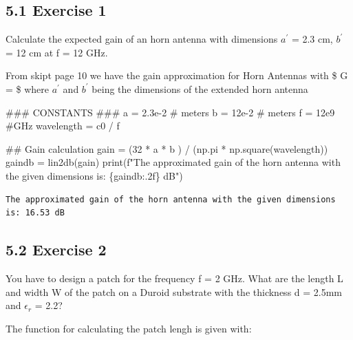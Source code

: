 \documentclass[
  letterpaper,
  DIV=11,
  numbers=noendperiod]{scrartcl}
\newenvironment{Shaded}{\begin{snugshade}}{\end{snugshade}}
\newcommand{\AlertTok}[1]{\textcolor[rgb]{0.68,0.00,0.00}{#1}}
\newcommand{\BuiltInTok}[1]{\textcolor[rgb]{0.00,0.23,0.31}{#1}}
\newcommand{\CommentTok}[1]{\textcolor[rgb]{0.37,0.37,0.37}{#1}}
\newcommand{\DecValTok}[1]{\textcolor[rgb]{0.68,0.00,0.00}{#1}}
\newcommand{\FloatTok}[1]{\textcolor[rgb]{0.68,0.00,0.00}{#1}}
\newcommand{\NormalTok}[1]{\textcolor[rgb]{0.00,0.23,0.31}{#1}}
\newcommand{\OperatorTok}[1]{\textcolor[rgb]{0.37,0.37,0.37}{#1}}
\newcommand{\SpecialCharTok}[1]{\textcolor[rgb]{0.37,0.37,0.37}{#1}}
\newcommand{\SpecialStringTok}[1]{\textcolor[rgb]{0.13,0.47,0.30}{#1}}
\begin{document}
\subsection{5.1 Exercise 1}\label{exercise-1}

Calculate the expected gain of an horn antenna with dimensions \(a^{'}\)
= 2.3 cm, \(b^{'}\) = 12 cm at f = 12 GHz.

From skipt page 10 we have the gain approximation for Horn Antennas with
\$ G = \$ where \(a^{'}\) and
\(b^{'}\) being the dimensions of the extended horn antenna

\begin{Shaded}
\begin{Highlighting}[]
\CommentTok{\#\#\# CONSTANTS }\AlertTok{\#\#\#}
\NormalTok{a }\OperatorTok{=} \FloatTok{2.3e{-}2} \CommentTok{\# meters}
\NormalTok{b }\OperatorTok{=} \FloatTok{12e{-}2} \CommentTok{\# meters}
\NormalTok{f }\OperatorTok{=} \FloatTok{12e9} \CommentTok{\#GHz}
\NormalTok{wavelength }\OperatorTok{=}\NormalTok{ c0 }\OperatorTok{/}\NormalTok{ f}

\CommentTok{\#\# Gain calculation}
\NormalTok{gain }\OperatorTok{=}\NormalTok{ (}\DecValTok{32} \OperatorTok{*}\NormalTok{ a }\OperatorTok{*}\NormalTok{ b ) }\OperatorTok{/}\NormalTok{ (np.pi }\OperatorTok{*}\NormalTok{ np.square(wavelength))}
\NormalTok{gaindb }\OperatorTok{=}\NormalTok{ lin2db(gain)}
\BuiltInTok{print}\NormalTok{(}\SpecialStringTok{f"The approximated gain of the horn antenna with the given dimensions is: }\SpecialCharTok{\{}\NormalTok{gaindb}\SpecialCharTok{:.2f\}}\SpecialStringTok{ dB"}\NormalTok{)}
\end{Highlighting}
\end{Shaded}

\begin{verbatim}
The approximated gain of the horn antenna with the given dimensions is: 16.53 dB
\end{verbatim}

\subsection{5.2 Exercise 2}\label{exercise-2}

You have to design a patch for the frequency f = 2 GHz. What are the
length L and width W of the patch on a Duroid substrate with the
thickness d = 2.5mm and \(\epsilon_{r}\) = 2.2?

The function for calculating the patch lengh is given with:
\end{document}
